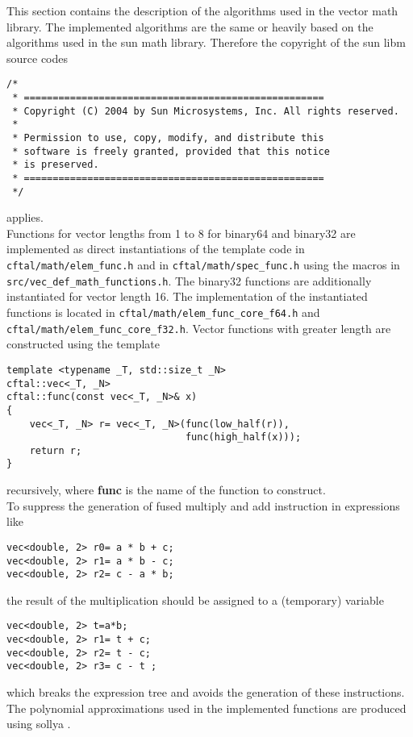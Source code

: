 \documentclass[10pt,a4paper,draft]{article}
\numberwithin{equation}{subsection}
\begin{document}
This section contains the description of the algorithms used in the
vector math library. The implemented algorithms are the same or
heavily based on the algorithms used in the sun math
library. Therefore the copyright of the sun libm source codes
\small
\begin{verbatim}
/*
 * ====================================================
 * Copyright (C) 2004 by Sun Microsystems, Inc. All rights reserved.
 *
 * Permission to use, copy, modify, and distribute this
 * software is freely granted, provided that this notice
 * is preserved.
 * ====================================================
 */
\end{verbatim}
\normalsize
applies.\\[10pt]
%
Functions for vector lengths from 1 to 8 for binary64 and binary32 are implemented as direct instantiations of the template code in
\lstinline{cftal/math/elem_func.h}
and in \lstinline{cftal/math/spec_func.h}
using the macros in
\lstinline{src/vec_def_math_functions.h}.
The binary32 functions are additionally instantiated for vector length 16.
The implementation of the instantiated functions is located in
\lstinline{cftal/math/elem_func_core_f64.h} and
\lstinline{cftal/math/elem_func_core_f32.h}.
Vector functions with greater length are constructed using the template
\begin{lstlisting}
template <typename _T, std::size_t _N>
cftal::vec<_T, _N>
cftal::func(const vec<_T, _N>& x)
{
    vec<_T, _N> r= vec<_T, _N>(func(low_half(r)),
                               func(high_half(x)));
    return r;
}
\end{lstlisting}
recursively, where \textbf{func} is the name of the
function to construct.\\[10pt]
%
To suppress the generation of fused multiply and add instruction
in expressions like
\begin{lstlisting}
vec<double, 2> r0= a * b + c;
vec<double, 2> r1= a * b - c;
vec<double, 2> r2= c - a * b;
\end{lstlisting}
the result of the multiplication should be assigned to a (temporary)
variable
\begin{lstlisting}
vec<double, 2> t=a*b;
vec<double, 2> r1= t + c;
vec<double, 2> r2= t - c;
vec<double, 2> r3= c - t ;
\end{lstlisting}
which breaks the expression tree and avoids the generation of these
instructions.\\[10pt]
%
The polynomial approximations used in the implemented functions
are produced using sollya \cite{ChevillardJoldesLauter2010}.
\end{document}
